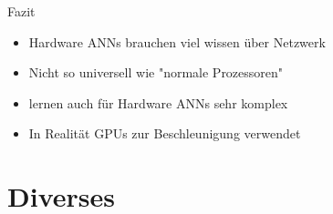 \documentclass[handout]{beamer}
\begin{document}
    \begin{frame}{Fazit}
        \begin{itemize}
            \item Hardware ANNs brauchen viel wissen über Netzwerk
            \item Nicht so universell wie "normale Prozessoren"
            \item lernen auch für Hardware ANNs sehr komplex
            \item In Realität GPUs zur Beschleunigung verwendet
        \end{itemize}
    \end{frame}


    \section{Diverses}
\end{document}
